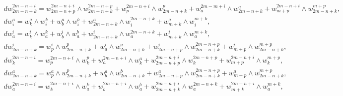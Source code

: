 \begin{equation}
\begin{array}{l}
%


dw^{2m{-}n{+}i}_{2m{-}n{+}k}{=} w^{2m{-}n{+}i}_{2m{-}n{+}p}


{\wedge } w^{2m{-}n{+}p}_{2m{-}n{+}k}{+} w^{2m{-}n{+}i}_{p}{\wedge }


w^{p}_{2m{-}n{+}k} {+}w^{2m{-}m{+}i}_{a} {\wedge } w^{a}_{2m{-


}n{+}k}{+}w^{2m{-}n{+}i}_{m{+}p} {\wedge }


w_{2m{-}n{+}k}^{m{+}p},\\


%


dw^{a}_i =w^{a}_k\wedge w^{k}_i+w^{a}_{b}\wedge


w^{b}_i+w^{a}_{2m-n+k}\wedge w^{2m-n+k}_i+w^{a}_{m+k}\wedge w^{m+k}_i,\\


%


dw^{i}_a =w^{i}_k\wedge w^{k}_a+w^{i}_{b}\wedge


w^{b}_a+w^{i}_{2m-n+k}\wedge w^{2m-n+k}_a+w^{i}_{m+k}\wedge w^{m+k}_a,\\


%


dw^{i}_{2m-n+k}= w^{i}_{p}\wedge w^{p}_{2m-n+k}+w^{i}_{a}\wedge


w^{a}_{2m-n+k}+w^{i}_{2m-n+p}\wedge w^{2m-n+p}_{2m-n+k}+w^{i}_{m+p}\wedge


w^{m+p}_{2m-n+k},\\


%


dw_{k}^{2m-n+i}= w^{2m-n+i}_{p}\wedge w^{p}_{k} +w^{2m-


n+i}_{a}\wedge w^{a}_{k}+w^{2m-n+i}_{2m-n+p}\wedge w^{2m-n+p}_{k}+w^{2m-


n+i}_{m+p}\wedge w^{m+p}_{k},\\


%


dw^{a}_{2m-n+k}= w^{a}_{p}\wedge w^{p}_{2m-n+k}+w^{a}_{b}\wedge


w^{b}_{2m-n+k}+w^{a}_{2m-n+p}\wedge w^{2m-n+p}_{2m-n+k}+w^{a}_{m+p}\wedge


w^{m+p}_{2m-n+k},\\


%


dw_{a}^{2m-n+i}= w^{2m-n+i}_{k}\wedge w^{k}_{a} +w^{2m-


n+i}_{b}\wedge w^{b}_{a}+w^{2m-n+i}_{2m-n+k}\wedge w^{2m-n+k}_{a}+w^{2m-


n+i}_{m+k}\wedge w^{m+k}_{a},


\end{array}


\end{equation}



